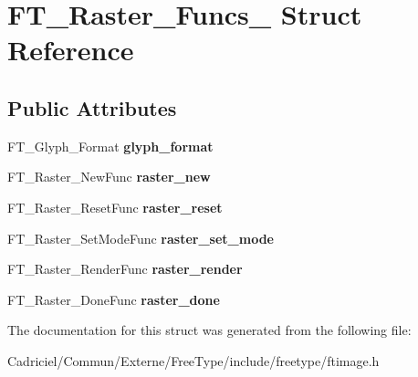 \hypertarget{struct_f_t___raster___funcs__}{\section{F\-T\-\_\-\-Raster\-\_\-\-Funcs\-\_\- Struct Reference}
\label{struct_f_t___raster___funcs__}
}
\subsection*{Public Attributes}
\begin{DoxyCompactItemize}
\item 
\hypertarget{struct_f_t___raster___funcs___a741b43afa16f1f1b7f633cebd9f1d6a9}{F\-T\-\_\-\-Glyph\-\_\-\-Format {\bfseries glyph\-\_\-format}}\label{struct_f_t___raster___funcs___a741b43afa16f1f1b7f633cebd9f1d6a9}

\item 
\hypertarget{struct_f_t___raster___funcs___a31c9df9af6636df8a17a11bcd921b6a4}{F\-T\-\_\-\-Raster\-\_\-\-New\-Func {\bfseries raster\-\_\-new}}\label{struct_f_t___raster___funcs___a31c9df9af6636df8a17a11bcd921b6a4}

\item 
\hypertarget{struct_f_t___raster___funcs___a91e9decd6066090a5f306f33f9815d39}{F\-T\-\_\-\-Raster\-\_\-\-Reset\-Func {\bfseries raster\-\_\-reset}}\label{struct_f_t___raster___funcs___a91e9decd6066090a5f306f33f9815d39}

\item 
\hypertarget{struct_f_t___raster___funcs___a3b37c781e54cf933cb60f57f2d45b32c}{F\-T\-\_\-\-Raster\-\_\-\-Set\-Mode\-Func {\bfseries raster\-\_\-set\-\_\-mode}}\label{struct_f_t___raster___funcs___a3b37c781e54cf933cb60f57f2d45b32c}

\item 
\hypertarget{struct_f_t___raster___funcs___a7479a3def4522ce2667d6772e7bb96a5}{F\-T\-\_\-\-Raster\-\_\-\-Render\-Func {\bfseries raster\-\_\-render}}\label{struct_f_t___raster___funcs___a7479a3def4522ce2667d6772e7bb96a5}

\item 
\hypertarget{struct_f_t___raster___funcs___aecfd50bb6567d4442c997467cd68c857}{F\-T\-\_\-\-Raster\-\_\-\-Done\-Func {\bfseries raster\-\_\-done}}\label{struct_f_t___raster___funcs___aecfd50bb6567d4442c997467cd68c857}

\end{DoxyCompactItemize}


The documentation for this struct was generated from the following file\-:\begin{DoxyCompactItemize}
\item 
Cadriciel/\-Commun/\-Externe/\-Free\-Type/include/freetype/ftimage.\-h\end{DoxyCompactItemize}
